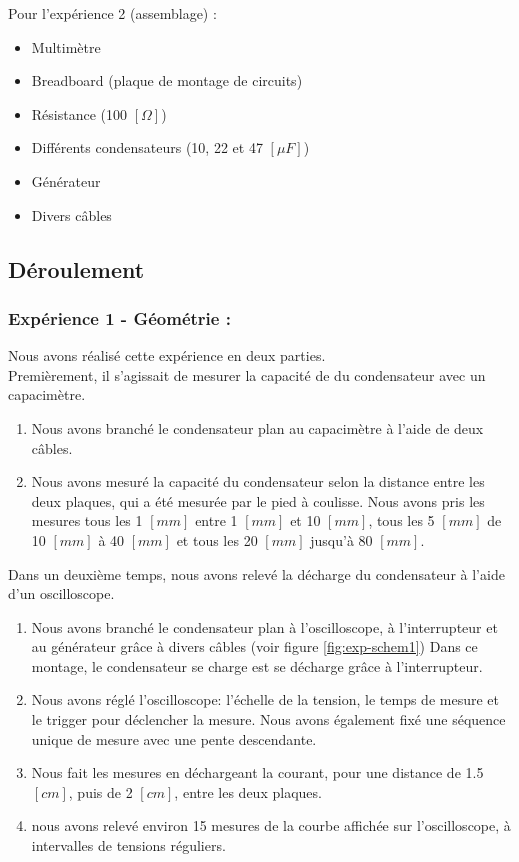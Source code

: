 \documentclass[11pt]{article}
\begin{document}
Pour l'expérience 2 (assemblage) :
\begin{itemize}
\item Multimètre
\item Breadboard (plaque de montage de circuits)
\item Résistance (100 $[\Omega]$)
\item Différents condensateurs (10, 22 et 47 $[\mu F]$)
\item Générateur
\item Divers câbles
\end{itemize}

\subsection{Déroulement}
\subsubsection{Expérience 1 - Géométrie :} 
Nous avons réalisé cette expérience en deux parties.\\
Premièrement, il s'agissait de mesurer la capacité de du condensateur avec un capacimètre. 
\begin{enumerate}
\item Nous avons branché le condensateur plan au capacimètre à l'aide de deux câbles.
\item Nous avons mesuré la capacité du condensateur selon la distance entre les deux plaques, qui a été mesurée par le pied à coulisse. Nous avons pris les mesures tous les 1 $[mm]$ entre 1 $[mm]$ et 10 $[mm]$, tous les 5 $[mm]$ de 10 $[mm]$ à 40 $[mm]$ et tous les 20 $[mm]$ jusqu'à 80 $[mm]$. 
\end{enumerate}
Dans un deuxième temps, nous avons relevé la décharge du condensateur à l'aide d'un oscilloscope.
\begin{enumerate}
\item Nous avons branché le condensateur plan à l'oscilloscope, à l'interrupteur et au générateur grâce à divers câbles (voir figure \ref{fig:exp-schem1}) Dans ce montage, le condensateur se charge est se décharge grâce à l'interrupteur.
\item Nous avons réglé l'oscilloscope: l'échelle de la tension, le temps de mesure et le trigger pour déclencher la mesure. Nous avons également fixé une séquence unique de mesure avec une pente descendante.
\item Nous fait les mesures en déchargeant la courant, pour une distance de 1.5 $[cm]$, puis de 2 $[cm]$, entre les deux plaques.
\item nous avons relevé environ 15 mesures de la courbe affichée sur l'oscilloscope, à intervalles de tensions réguliers.
\end{enumerate} 
\end{document}
